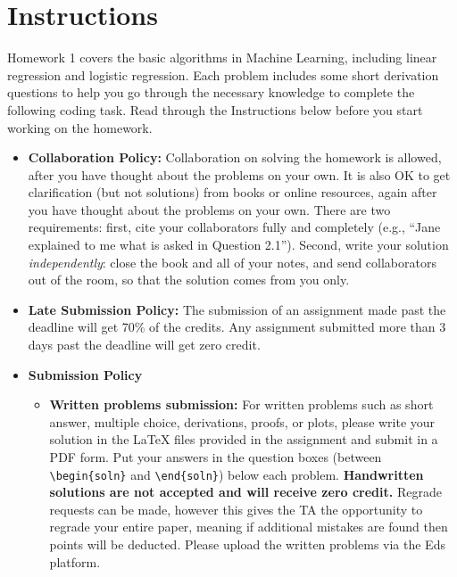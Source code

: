 \section*{Instructions}

\begin{notebox}
Homework 1 covers the basic algorithms in Machine Learning, including linear regression and logistic regression. Each problem includes some short derivation questions to help you go through the necessary knowledge to complete the following coding task. Read through the Instructions below before you start working on the homework.
\end{notebox}

\begin{itemize}
\item \textbf{Collaboration Policy:} Collaboration on solving the homework is allowed, after you have thought about the problems on your own. It is also OK to get clarification (but not solutions) from books or online resources, again after you have thought about the problems on your own. There are two requirements: first, cite your collaborators fully and completely (e.g., ``Jane explained to me what is asked in Question 2.1''). Second, write your solution {\em independently}: close the book and all of your notes, and send collaborators out of the room, so that the solution comes from you only. 

\item\textbf{Late Submission Policy:} The submission of an assignment made past the deadline will get 70\% of the credits. Any assignment submitted more than 3 days past the deadline will get zero credit.

\item\textbf{Submission Policy} 

\begin{itemize}
\item \textbf{Written problems submission:} For written problems such as short answer, multiple choice, derivations, proofs, or plots, please write your solution in the LaTeX files provided in the assignment and submit in a PDF form. Put your answers in the question boxes (between \texttt{\textbackslash begin\{soln\}} and \texttt{\textbackslash end\{soln\}}) below each problem. \textbf{Handwritten solutions are not accepted and will receive zero credit.} Regrade requests can be made, however this gives the TA the opportunity to regrade your entire paper, meaning if additional mistakes are found then points will be deducted. Please upload the written problems via the Eds platform.


\end{itemize}
\end{itemize}

